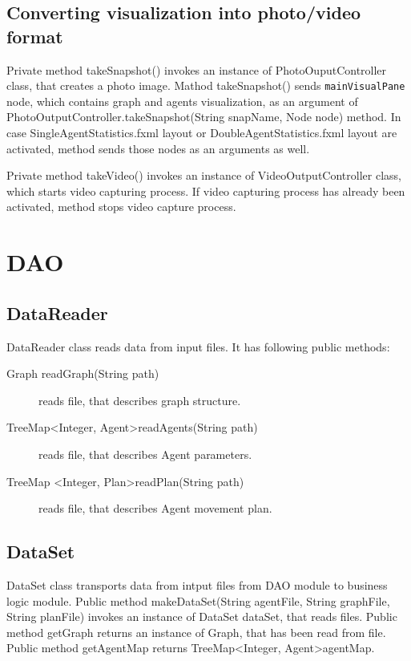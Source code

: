 \documentclass[thesis=B,english]{FITthesis}[2019/12/23]
\begin{document}
\subsection{Converting visualization into photo/video format}

Private method takeSnapshot() invokes an instance of PhotoOuputController class, that
creates a photo image. Mathod takeSnapshot() sends \verb|mainVisualPane| node, which contains graph and agents visualization, as an argument of  PhotoOutputController.takeSnapshot(String snapName, Node node) method. In case SingleAgentStatistics.fxml layout or DoubleAgentStatistics.fxml layout are activated, method sends those nodes as an arguments as well.

Private method takeVideo() invokes an instance of VideoOutputController class, which starts video capturing process. If video capturing process has already been activated, method stops video capture process. 

\section{DAO}

\subsection{DataReader}

DataReader class reads data from input files. It has following public methods:
\begin{description}
\item[Graph readGraph(String path)] reads file, that describes graph structure.   
\item[TreeMap\textless Integer, Agent\textgreater readAgents(String path)] reads file, that describes Agent parameters.
\item[TreeMap \textless Integer, Plan\textgreater readPlan(String path)] reads file, that describes Agent movement plan.
\end{description}

\subsection{DataSet}

DataSet class transports data from intput files from DAO module to business logic module. Public method makeDataSet(String agentFile, String graphFile, String planFile) invokes an instance of DataSet dataSet, that reads files. Public method getGraph returns an instance of Graph, that has been read from file. Public method getAgentMap returns TreeMap\textless Integer, Agent\textgreater agentMap.
\end{document}
